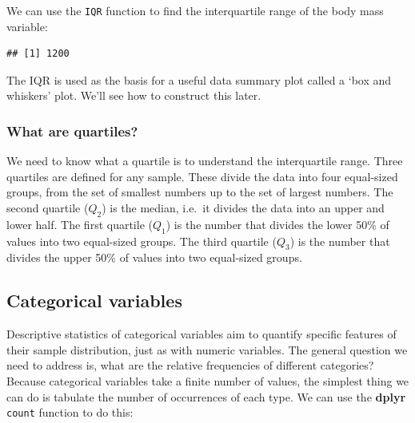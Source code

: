 \documentclass[
]{book}
\newenvironment{Shaded}{\begin{snugshade}}{\end{snugshade}}
\newcommand{\AttributeTok}[1]{\textcolor[rgb]{0.77,0.63,0.00}{#1}}
\newcommand{\ConstantTok}[1]{\textcolor[rgb]{0.00,0.00,0.00}{#1}}
\newcommand{\FunctionTok}[1]{\textcolor[rgb]{0.00,0.00,0.00}{#1}}
\newcommand{\NormalTok}[1]{#1}
\newcommand{\SpecialCharTok}[1]{\textcolor[rgb]{0.00,0.00,0.00}{#1}}
\newenvironment{greybox}{
  \definecolor{shadecolor}{rgb}{0.95,0.95,0.95}  %
  \color{black}
  \begin{shaded}}
 {\end{shaded}}
\newenvironment{infobox}[1]
  {
  \begin{itemize}
  \renewcommand{\labelitemi}{
    \raisebox{-.7\height}[0pt][0pt]{
      {\setkeys{Gin}{width=3em,keepaspectratio}
        \texttt{[image: images/\#1]}}
    }
  }
  \setlength{\fboxsep}{1em}
  \begin{greybox}
  \item
  }
  {
  \end{greybox}
  \end{itemize}
  }
\begin{document}
We can use the \texttt{IQR} function to find the interquartile range of the body mass variable:

\begin{Shaded}
\end{Shaded}

\begin{verbatim}
## [1] 1200
\end{verbatim}

The IQR is used as the basis for a useful data summary plot called a `box and whiskers' plot. We'll see how to construct this later.

\begin{infobox}{information}

\hypertarget{what-are-quartiles}{%
\subsubsection*{What are quartiles?}\label{what-are-quartiles}}

We need to know what a quartile is to understand the interquartile range. Three quartiles are defined for any sample. These divide the data into four equal-sized groups, from the set of smallest numbers up to the set of largest numbers. The second quartile (\(Q_2\)) is the median, i.e.~it divides the data into an upper and lower half. The first quartile (\(Q_1\)) is the number that divides the lower 50\% of values into two equal-sized groups. The third quartile (\(Q_3\)) is the number that divides the upper 50\% of values into two equal-sized groups.

\end{infobox}

\hypertarget{categorical-variables}{%
\subsection{Categorical variables}\label{categorical-variables}}

Descriptive statistics of categorical variables aim to quantify specific features of their sample distribution, just as with numeric variables. The general question we need to address is, what are the relative frequencies of different categories? Because categorical variables take a finite number of values, the simplest thing we can do is tabulate the number of occurrences of each type. We can use the \textbf{dplyr} \texttt{count} function to do this:
\end{document}
